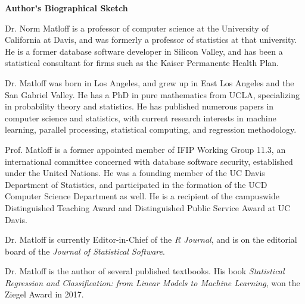 \begin{center}
{\bf Author's Biographical Sketch}
\end{center}

Dr. Norm Matloff is a professor of computer science at the University of
California at Davis, and was formerly a professor of statistics at that
university. He is a former database software developer in Silicon
Valley, and has been a statistical consultant for firms such as the
Kaiser Permanente Health Plan.

Dr. Matloff was born in Los Angeles, and grew up in East Los Angeles and
the San Gabriel Valley. He has a PhD in pure mathematics from UCLA,
specializing in probability theory and statistics.  He has published
numerous papers in computer science and statistics, with current
research interests in machine learning, parallel processing, statistical
computing, and regression methodology.

Prof. Matloff is a former appointed member of IFIP Working Group 11.3,
an international committee concerned with database software security,
established under the United Nations.  He was a founding member of the
UC Davis Department of Statistics, and participated in the formation of
the UCD Computer Science Department as well.  He is a recipient of the
campuswide Distinguished Teaching Award and Distinguished Public Service
Award at UC Davis.

Dr. Matloff is currently Editor-in-Chief of the \textit{R Journal}, and
is on the editorial board of the \textit{Journal of Statistical
Software}.

Dr. Matloff is the author of several published textbooks.  His book {\it
Statistical Regression and Classification: from Linear Models to Machine
Learning}, won the Ziegel Award in 2017.


